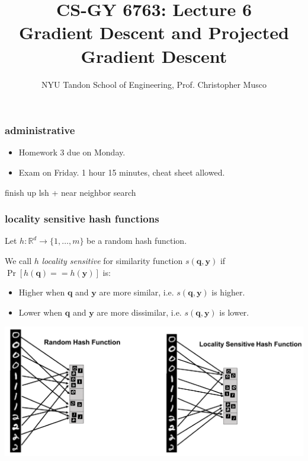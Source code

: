 \documentclass[compress]{beamer}
\title{CS-GY 6763: Lecture 6 \\ Gradient Descent and Projected Gradient Descent}
\author{NYU Tandon School of Engineering, Prof. Christopher Musco}
\date{}
\newcommand{\bv}[1]{\mathbf{#1}}
\newcommand{\R}{\mathbb{R}}
\begin{document}
\begin{frame}
	\titlepage 
\end{frame}


\begin{frame}
	\frametitle{administrative}
	\begin{itemize}
		\item Homework 3 due on Monday.
		\item Exam on Friday. 1 hour 15 minutes, cheat sheet allowed. 
	\end{itemize}
\end{frame}

\begin{frame}[standout]
	\begin{center}
		finish up lsh + near neighbor search
	\end{center}
\end{frame}

\begin{frame}
	\frametitle{locality sensitive hash functions}
	Let $h: \R^d \rightarrow \{1, \ldots, m\}$ be a random hash function. 
	
	We call $h$ \emph{locality sensitive} for similarity function $s(\bv{q},\bv{y})$ if $\Pr\left[h(\bv{q}) == h(\bv{y})\right]$ is:
	\begin{itemize}
		\item Higher when $\bv{q}$ and $\bv{y}$ are more similar, i.e. $s(\bv{q},\bv{y})$ is higher.
		\item Lower when $\bv{q}$ and $\bv{y}$ are more dissimilar, i.e. $s(\bv{q},\bv{y})$ is lower. 
	\end{itemize}
\begin{center}
	\includegraphics[width=.9\textwidth]{cam_lsh.png}
\end{center}
\end{frame}
\end{document}
